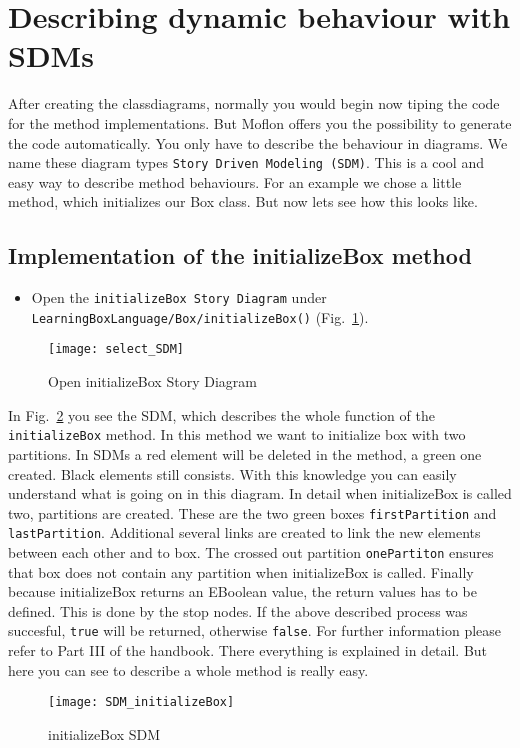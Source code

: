 \newpage
\section{Describing dynamic behaviour with SDMs}

After creating the classdiagrams, normally you would begin now tiping the code for the method implementations. But Moflon offers you the possibility to generate the code automatically. You only have to describe the behaviour in diagrams. We name these diagram types \texttt{Story Driven Modeling (SDM)}. This is a cool and easy way to describe method behaviours.
\newline
For an example we chose a little method, which initializes our Box class. But now lets see how this looks like.


\subsection{Implementation of the initializeBox method}

\begin{itemize}
\item Open the \texttt{initializeBox Story Diagram} under \texttt{Learning\-Box\-Lan\-guage/Box/initialize\-Box()} (Fig.~\ref{open_deleteNode}).
\end{itemize}
\begin{figure}[htbp]
	\centering
  \texttt{[image: select\_SDM]}
	\caption{Open initializeBox Story Diagram} 
	\label{open_deleteNode} 
\end{figure}

In Fig.~\ref{sdm_initializeBox} you see the SDM, which describes the whole function of the \texttt{initializeBox} method. In this method we want to initialize box with two partitions.
\newline
In SDMs a red element will be deleted in the method, a green one created. Black elements still consists. With this knowledge you can easily understand what is going on in this diagram.
\newline
In detail when initializeBox is called two, partitions are created. These are the two green boxes \texttt{firstPartition} and \texttt{lastPartition}. Additional several links are created to link the new elements between each other and to box.
\newline
The crossed out partition \texttt{onePartiton} ensures that box does not contain any partition when initializeBox is called.
\newline
Finally because initializeBox returns an EBoolean value, the return values has to be defined. This is done by the stop nodes. If the above described process was succesful, \texttt{true} will be returned, otherwise \texttt{false}.
\newline
For further information please refer to Part III of the handbook. There everything is explained in detail. But here you can see to describe a whole method is really easy.

\begin{figure}[htbp]
	\centering
  \texttt{[image: SDM\_initializeBox]}
	\caption{initializeBox SDM} 
	\label{sdm_initializeBox} 
\end{figure}



